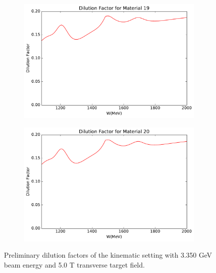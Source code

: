 \begin{figure}[h!]
  \centering
  \begin{subfigure}[t]{0.49\textwidth}
    \includegraphics[width=\textwidth]{figs/dilution-33505090-19.pdf}
  \end{subfigure}
  \begin{subfigure}[t]{0.49\textwidth}
    \includegraphics[width=\textwidth]{figs/dilution-33505090-20.pdf}
  \end{subfigure}
  \caption[Dilution factors with $E=3.350$ GeV and $B=2.5$ T.]{Preliminary dilution factors of the kinematic setting with 3.350 GeV beam energy and 5.0 T transverse target field. \label{C7S4F6}}
\end{figure}

